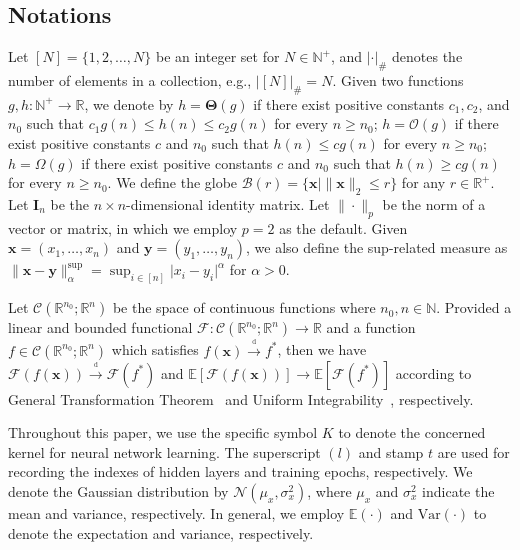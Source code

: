 \documentclass[review,10pt]{JMtemplate}
\begin{document}
\subsection{Notations}  \label{subsec:notations}
Let $[N] = \{1, 2, \dots, N\}$ be an integer set for $N \in \mathbb{N}^+$, and $|\cdot|_{\#}$ denotes the number of elements in a collection, e.g., $|[N]|_{\#} = N$. Given two functions $g,h\colon \mathbb{N}^+\rightarrow \mathbb{R}$, we denote by $h=\mathbf{\Theta}(g)$ if there exist positive constants $c_1,c_2$, and $n_0$ such that $c_1g(n) \leq h(n) \leq c_2g(n)$ for every $n \geq n_0$; $h=\mathcal{O}(g)$ if there exist positive constants $c$ and $n_0$ such that $h(n) \leq cg(n)$ for every $n \geq n_0$; $h=\Omega(g)$ if there exist positive constants $c$ and $n_0$ such that $h(n) \geq cg(n)$ for every $n \geq n_0$. We define the globe $\mathcal{B}(r) = \{ \boldsymbol{x} \mid \| \boldsymbol{x} \|_2 \leq r \}$ for any $r\in\mathbb{R}^+$. Let $\mathbf{I}_n$ be the $n \times n$-dimensional identity matrix. Let $\|\cdot\|_p$ be the norm of a vector or matrix, in which we employ $p=2$ as the default. Given $\boldsymbol{x}=(x_1,\dots,x_n)$ and $\boldsymbol{y}=(y_1,\dots,y_n)$, we also define the sup-related measure as $\| \boldsymbol{x} - \boldsymbol{y} \|_{\alpha}^{\textrm{sup}} = \sup_{i\in[n]} \big| x_i - y_i \big|^{\alpha}$ for $\alpha>0$.



Let $\mathcal{C}(\mathbb{R}^{n_0};\mathbb{R}^n)$ be the space of continuous functions where $n_0,n\in\mathbb{N}$. Provided a linear and bounded functional $\mathcal{F}: \mathcal{C}(\mathbb{R}^{n_0};\mathbb{R}^n) \to \mathbb{R}$ and a function $f \in  \mathcal{C}(\mathbb{R}^{n_0};\mathbb{R}^n)$ which satisfies $f(\boldsymbol{x}) \overset{\underset{\mathrm{d}}{}}{\to} f^*$, then we have $\mathcal{F} (f(\boldsymbol{x})) \overset{\underset{\mathrm{d}}{}}{\to} \mathcal{F}(f^*)$ and $\mathbb{E} \left[ \mathcal{F} (f(\boldsymbol{x})) \right] \to \mathbb{E} \left[ \mathcal{F}(f^*) \right]$ according to General Transformation Theorem~\citep[Theorem 2.3]{van2000asymptotic} and Uniform Integrability~\citep{billingsley2013convergence}, respectively.

Throughout this paper, we use the specific symbol $K$ to denote the concerned kernel for neural network learning. The superscript $(l)$ and stamp $t$ are used for recording the indexes of hidden layers and training epochs, respectively. We denote the Gaussian distribution by $\mathcal{N}(\mu_x, \sigma_x^2)$, where $\mu_x$ and $\sigma_x^2$ indicate the mean and variance, respectively. In general, we employ $\mathbb{E}(\cdot)$ and $\mathrm{Var}(\cdot)$ to denote the expectation and variance, respectively.
\end{document}
